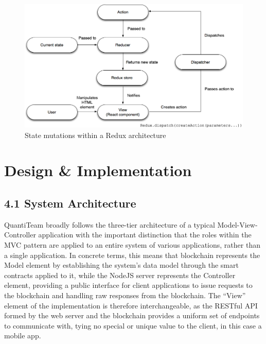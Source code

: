 \documentclass[12pt]{report}
\begin{document}
\begin{figure}[htbp]
\centering
\includegraphics{../diagrams/redux.png}
\caption{State mutations within a Redux architecture\cite{1reduxibm}}
\end{figure}

\clearpage

\chapter{Design \& Implementation}

\section{4.1 System Architecture}\label{system-architecture}

QuantiTeam broadly follows the three-tier architecture of a typical
Model-View-Controller\cite{krasner1988description} application with the important distinction that the
roles within the MVC pattern are applied to an entire system of various
applications, rather than a single application. In concrete terms, this
means that blockchain represents the Model element by establishing the
system's data model through the smart contracts applied to it, while the
NodeJS server represents the Controller element, providing a public
interface for client applications to issue requests to the blockchain
and handling raw responses from the blockchain. The ``View'' element of
the implementation is therefore interchangeable, as the RESTful API
formed by the web server and the blockchain provides a uniform set of
endpoints to communicate with, tying no special or unique value to the
client, in this case a mobile app.
\end{document}
